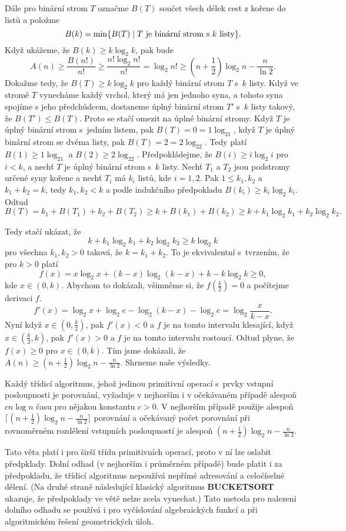 \documentclass[a4paper,12pt]{article}
\begin{document}
Dále pro binární strom $T$ označme $B(T)$ součet všech 
délek cest z kořene do listů a položme 
$$B(k)=\min\{B(T)\mid T\text{\rm\ je binární strom s~$k$ listy}
\}.$$
Když ukážeme, že $B(k)\ge k\log_2k$, pak bude 
$$A(n)\ge\frac {B(n!)}{n!}\ge\frac {n!\log_2n!}{n!}=\log_2n!\ge (
n+\frac 12)\log_2n-\frac n{\ln2}.$$
Dokažme tedy, že $B(T)\ge k\log_2k$ pro každý binární 
strom $T$ s~$k$ listy. Když ve stromě $T$ vynecháme každý 
vrchol, který má jen jednoho syna, a tohoto syna spojíme 
s jeho předchůdcem, dostaneme úplný binární 
strom $T'$ s~$k$ listy tako\-vý, že $B(T')\le B(T)$. Proto se stačí  
omezit na úplné binární stromy. Když $T$ je úplný 
binární strom s~jedním listem, pak $B(T)=0=1\log_21$, 
když $T$ je úplný binární strom se dvěma listy, pak 
$B(T)=2=2\log_22$. Tedy platí $B(1)\ge 1\log_21$ a $B(2)\ge 2\log_
22$. 
Předpokládejme, že $B(i)\ge i\log_2i$ pro $i<k$, a nechť $
T$ je 
úplný binární strom s~$k$ listy. Nechť $T_1$ a $T_2$ jsou 
podstromy určené syny kořene a nechť $T_i$ má $k_i$ 
listů, kde $i=1,2$. Pak $1\le k_1,k_2$ a $k_1+k_2=k$, tedy 
$k_1,k_2<k$ a podle indukčního předpokladu $B(k_i)\ge k_
i\log_2k_i$. 
Odtud 
$$B(T)=k_1+B(T_1)+k_2+B(T_2)\ge k+B(k_1)+B(k_2)\ge k+k_1\log_2k_1
+k_2\log_2k_2.$$

Tedy stačí ukázat, že 
$$k+k_1\log_2k_1+k_2\log_2k_2\ge k\log_2k$$
pro všechna $k_1,k_2>0$ taková, že $k=k_1+k_2$. To je 
ekvivalentní s~tvrzením, že pro $k>0$ platí 
$$f(x)=x\log_2x+(k-x)\log_2(k-x)+k-k\log_2k\ge 0,$$
kde $x\in (0,k)$. 
Abychom to dokázali, všimněme si, že $f(\frac k2)=0$ a  
počí\-tejme derivaci $f$.
$$f'(x)=\log_2x+\log_2e-\log_2(k-x)-\log_2e=\log_2\frac x{k-x}.$$
Nyní když $x\in (0,\frac k2)$, pak $f'(x)<0$ a $f$ je na tomto intervalu 
klesající, když $x\in (\frac k2,k)$, pak $f'(x)>0$ a $
f$ je na tomto 
intervalu rostoucí. Odtud plyne, že $f(x)\ge 0$ pro $x\in 
(0,k)$.
Tím jsme dokázali, že $A(n)\ge (n+\frac 12)\log_2n-\frac 
n{\ln2}$. Shrneme 
naše výsledky.

\begin{veta}Každý třídicí algoritmus, jehož jedinou 
primitivní ope\-rací s~prvky vstupní posloupnosti je 
porovnání, vyžaduje v nejhorším i v očekávaném případě 
alespoň $cn\log n$ času pro nějakou konstantu $c>0$.  V 
nejhorším případě použije alespoň $\lceil 
(n+\frac 12)\log_2n-\frac n{\ln2}\rceil$ 
porovnání a očekávaný počet porovnání při rovnoměrném 
rozdělení vstupních posloupností je alespoň 
$(n+\frac 12)\log_2n-\frac n{\ln2}$.  
\end{veta}

Tato věta 
platí i pro širší třídu primitivních operací, proto v ní 
lze oslabit předpklady. 
Dolní odhad (v nejhorším i průměrném případě) 
bude platit i za 
před\-pokladu, že třídicí algoritmus nepoužívá nepřímé 
adreso\-vání a celo\-číselné dělení. 
(Na druhé straně následující klasický algoritmus 
{\bf BUCKETSORT} ukazuje, že před\-poklady
ve větě nelze zcela vynechat.) 
Tato metoda pro 
nalezení dolního odhadu se používá i pro vyčíslování 
algebraických funkcí a při algoritmickém řešení 
geometrických úloh.
\end{document}
